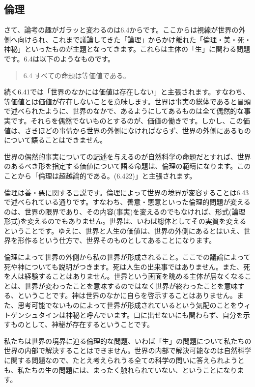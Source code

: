 \documentclass[12pt]{jsarticle}
\begin{document}
\subsection{倫理}
さて、論考の趣がガラッと変わるのは6.4からです。ここからは視線が世界の外側へ向けられ、これまで議論してきた「論理」からかけ離れた「倫理・美・死・神秘」といったものが主題となってきます。これらは主体の「生」に関わる問題です。6.4は以下のようなものです。
\begin{quote}
6.4 すべての命題は等価値である。
\end{quote}
続く6.41では「世界のなかには価値は存在しない」と主張されます。すなわち、等価値とは価値が存在しないことを意味します。世界は事実の総体であると冒頭で述べられたように、世界のなかで、あるようにしてあるものは全て偶然的な事実です。それらを偶然でないものとするのが、価値の働きです。しかし、この価値は、さきほどの事情から世界の外側になければならず、世界の外側にあるものについて語ることはできません。\par
世界の偶然的事実についての記述を与えるのが自然科学の命題だとすれば、世界のあるべき形を指定する価値について語る命題は、倫理の範疇になります。このことから「倫理は超越論的である。(6.422)」と主張されます。\par
倫理は善・悪に関する言説です。倫理によって世界の境界が変容することは6.43で述べられている通りです。すなわち、善意・悪意といった倫理的問題が変えるのは、世界の限界であり、その内容(事実)を変えるのでもなければ、形式(論理形式)を変えるのでもありません。世界は、いわば総体としてその実質を変えるということです。ゆえに、世界と人生の価値は、世界の外側にあるとはいえ、世界を形作るという仕方で、世界そのものとしてあることになります。
\par
倫理によって世界の外側から私の世界が形成されること。ここでの議論によって死や神についても説明がつきます。死は人生の出来事ではありません。また、死を人は経験することはありません。世界という画面を眺める主体が居なくなることは、世界が変わったことを意味するのではなく世界が終わったことを意味する、ということです。神は世界のなかに自らを啓示することはありません。また、思考可能でないものによって世界が形成されているという気配のことをウィトゲンシュタインは神秘と呼んでいます。口に出せないにも関わらず、自分を示すものとして、神秘が存在するということです。
\par
私たちは世界の境界に迫る倫理的な問題、いわば「生」の問題について私たちの世界の内部で解決することはできません。世界の内部で解決可能なのは自然科学に関する問題なので、たとえ考えられうる全ての科学の問いに答えられようとも、私たちの生の問題には、まったく触れられていない、ということになります。
\end{document}
